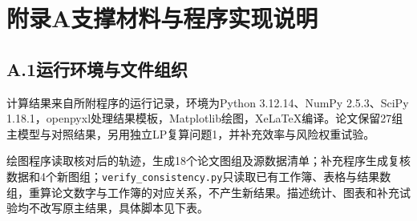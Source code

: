 \documentclass[UTF8,fontset=none,a4paper,zihao=-4]{ctexart}
\begin{document}
\section*{附录A\quad 支撑材料与程序实现说明}
\subsection*{A.1\quad 运行环境与文件组织}
计算结果来自所附程序的运行记录，环境为Python 3.12.14、NumPy 2.5.3、SciPy 1.18.1，openpyxl处理结果模板，Matplotlib绘图，XeLaTeX编译。论文保留27组主模型与对照结果，另用独立LP复算问题1，并补充效率与风险权重试验。

绘图程序读取核对后的轨迹，生成18个论文图组及源数据清单；补充程序生成复核数据和4个新图组；\texttt{verify\_consistency.py}只读取已有工作簿、表格与结果数组，重算论文数字与工作簿的对应关系，不产生新结果。描述统计、图表和补充试验均不改写原主结果，具体脚本见下表。
\end{document}
